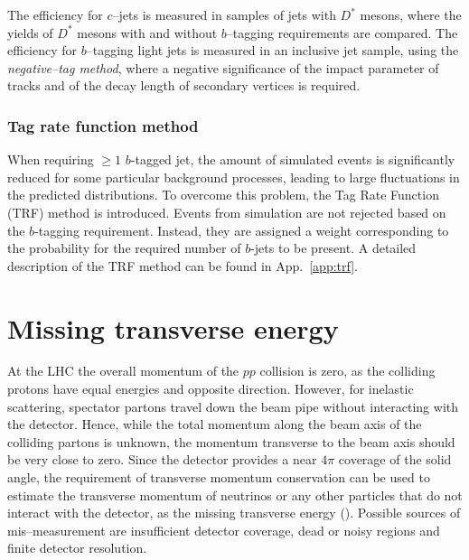 The efficiency for $c$--jets is measured in samples of jets with
$D^*$ mesons, where the yields of $D^*$ mesons with and without
$b$--tagging requirements are compared.
The efficiency for $b$--tagging light jets is measured in an inclusive
jet sample, using the {\it negative--tag method}, where a negative
significance of the impact parameter of tracks and of the decay 
length of secondary vertices is required.

\subsubsection{Tag rate function method}
\label{sec:trf}

When requiring $\geq 1$ $b$-tagged jet, the amount of simulated events
is significantly reduced for some particular background
processes, leading to large fluctuations in the predicted distributions.
To overcome this problem, the Tag Rate Function (TRF) method is introduced.
Events from simulation are not rejected based on the $b$-tagging
requirement. Instead, they are assigned a weight corresponding to the
probability for the required number of $b$-jets to be present.
A detailed description of the TRF method can be found in App.~\ref{app:trf}.

\section{Missing transverse energy}
\label{sec:met}

At the LHC the overall momentum of the $pp$ collision is zero, as the
colliding protons have equal energies and opposite direction. 
However, for inelastic scattering, spectator partons travel down the
beam pipe without interacting with the detector. Hence, while the total
momentum along the beam axis of the colliding partons is unknown, the
momentum transverse to the beam axis should be very close to
zero. Since the detector provides a near $4\pi$ coverage of the solid
angle, the requirement of transverse momentum conservation can be used
to estimate the transverse momentum of neutrinos or any other
particles that do not interact with the detector, as the missing transverse energy
(\met{}). Possible sources of \met{} mis--measurement are insufficient
detector coverage, dead or noisy regions and finite detector resolution.

